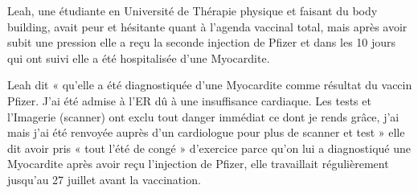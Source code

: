 Leah, une étudiante en Université de Thérapie physique et faisant du body
building, avait peur et hésitante quant à l’agenda vaccinal total, mais après
avoir subit une pression elle a reçu la seconde injection de Pfizer et dans les
10 jours qui ont suivi elle a été hospitalisée d’une Myocardite.

Leah dit « qu’elle a été diagnostiquée d’une Myocardite comme résultat du vaccin
Pfizer. J’ai été admise à l’ER dû à une insuffisance cardiaque. Les tests et
l’Imagerie (scanner) ont exclu tout danger immédiat ce dont je rends grâce, j’ai
mais j’ai été renvoyée auprès d’un cardiologue pour plus de scanner et test »
elle dit avoir pris « tout l’été de congé » d’exercice parce qu’on lui a
diagnostiqué une Myocardite après avoir reçu l’injection de Pfizer, elle
travaillait régulièrement jusqu’au 27 juillet avant la vaccination.
